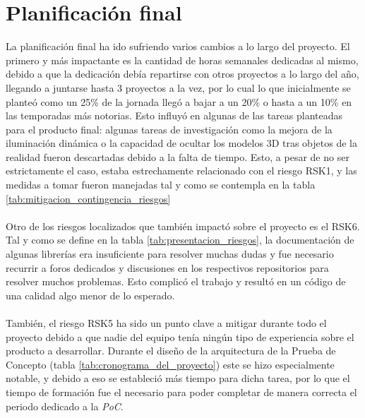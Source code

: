 \documentclass{subfiles}
\begin{document}
        \section{Planificación final}
        \label{sec:planificacion_final}

        La planificación final ha ido sufriendo varios cambios a lo largo del proyecto. El primero y más impactante es la cantidad de horas semanales dedicadas al mismo, debido a que la dedicación debía repartirse con otros proyectos a lo largo del año, llegando a juntarse hasta 3 proyectos a la vez, por lo cual lo que inicialmente se planteó como un 25\% de la jornada llegó a bajar a un 20\% o hasta a un 10\% en las temporadas más notorias. Esto influyó en algunas de las tareas planteadas para el producto final: algunas tareas de investigación como la mejora de la iluminación dinámica o la capacidad de ocultar los modelos 3D tras objetos de la realidad fueron descartadas debido a la falta de tiempo. Esto, a pesar de no ser estrictamente el caso, estaba estrechamente relacionado con el riesgo RSK1, y las medidas a tomar fueron manejadas tal y como se contempla en la tabla \ref{tab:mitigacion_contingencia_riesgos}

        \paragraph{}
        Otro de los riesgos localizados que también impactó sobre el proyecto es el RSK6. Tal y como se define en la tabla \ref{tab:presentacion_riesgos}, la documentación de algunas librerías era insuficiente para resolver muchas dudas y fue necesario recurrir a foros dedicados y discusiones en los respectivos repositorios para resolver muchos problemas. Esto complicó el trabajo y resultó en un código de una calidad algo menor de lo esperado.

        \paragraph{}
        También, el riesgo RSK5 ha sido un punto clave a mitigar durante todo el proyecto debido a que nadie del equipo tenía ningún tipo de experiencia sobre el producto a desarrollar. Durante el diseño de la arquitectura de la Prueba de Concepto (tabla \ref{tab:cronograma_del_proyecto}) este se hizo especialmente notable, y debido a eso se estableció más tiempo para dicha tarea, por lo que el tiempo de formación fue el necesario para poder completar de manera correcta el periodo dedicado a la \textit{PoC}.
\end{document}

